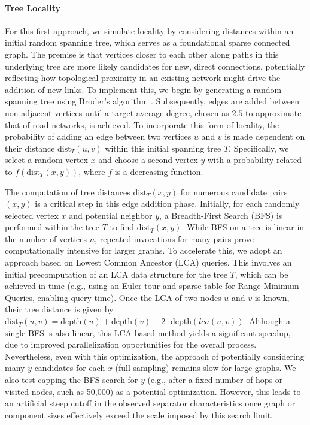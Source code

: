 \paragraph{Tree Locality}
For this first approach, we simulate locality by considering distances within an initial random spanning tree, which serves as a foundational sparse connected graph.
The premise is that vertices closer to each other along paths in this underlying tree are more likely candidates for new, direct connections, potentially reflecting how topological proximity in an existing network might drive the addition of new links.
To implement this, we begin by generating a random spanning tree using Broder's algorithm \cite{broder_generating_1989}.
Subsequently, edges are added between non-adjacent vertices until a target average degree, chosen as \(2.5\) to approximate that of road networks, is achieved.
To incorporate this form of locality, the probability of adding an edge between two vertices \(u\) and \(v\) is made dependent on their distance \( \text{dist}_T(u, v) \) within this initial spanning tree \(T\).
Specifically, we select a random vertex \(x\) and choose a second vertex \(y\) with a probability related to \(f(\text{dist}_T(x, y))\), where \(f\) is a decreasing function.

The computation of tree distances \(\text{dist}_T(x, y)\) for numerous candidate pairs \((x,y)\) is a critical step in this edge addition phase.
Initially, for each randomly selected vertex \(x\) and potential neighbor \(y\), a Breadth-First Search (BFS) is performed within the tree \(T\) to find \(\text{dist}_T(x, y)\).
While BFS on a tree is linear in the number of vertices \(n\), repeated invocations for many pairs prove computationally intensive for larger graphs.
To accelerate this, we adopt an approach based on Lowest Common Ancestor (LCA) queries.
This involves an initial precomputation of an LCA data structure for the tree \(T\), which can be achieved in  time (e.g., using an Euler tour and sparse table for Range Minimum Queries, enabling  query time).
Once the LCA of two nodes \(u\) and \(v\) is known, their tree distance is given by \(\text{dist}_T(u, v) = \text{depth}(u) + \text{depth}(v) - 2 \cdot \text{depth}(lca(u,v))\).
Although a single BFS is also linear, this LCA-based method yields a significant speedup, due to improved parallelization opportunities for the overall process.
Nevertheless, even with this optimization, the approach of potentially considering many \(y\) candidates for each \(x\) (full sampling) remains slow for large graphs.
We also test capping the BFS search for \(y\) (e.g., after a fixed number of hops or visited nodes, such as 50,000) as a potential optimization.
However, this leads to an artificial steep cutoff in the observed separator characteristics once graph or component sizes effectively exceed the scale imposed by this search limit.

